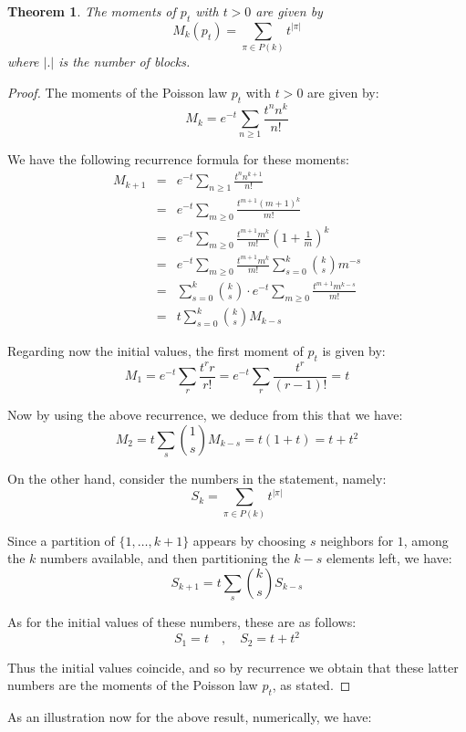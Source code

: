 \documentclass[12pt]{amsbook}
\newtheorem{theorem}{Theorem}[chapter]
\begin{document}

\begin{theorem}
The moments of $p_t$ with $t>0$ are given by
$$M_k(p_t)=\sum_{\pi\in P(k)}t^{|\pi|}$$
where $|.|$ is the number of blocks.
\end{theorem}

\begin{proof}
The moments of the Poisson law $p_t$ with $t>0$ are given by:
$$M_k=e^{-t}\sum_{n\geq1}\frac{t^nn^k}{n!}$$

We have the following recurrence formula for these moments:
\begin{eqnarray*}
M_{k+1}
&=&e^{-t}\sum_{n\geq1}\frac{t^nn^{k+1}}{n!}\\
&=&e^{-t}\sum_{m\geq0}\frac{t^{m+1}(m+1)^k}{m!}\\
&=&e^{-t}\sum_{m\geq0}\frac{t^{m+1}m^k}{m!}\left(1+\frac{1}{m}\right)^k\\
&=&e^{-t}\sum_{m\geq0}\frac{t^{m+1}m^k}{m!}\sum_{s=0}^k\binom{k}{s}m^{-s}\\
&=&\sum_{s=0}^k\binom{k}{s}\cdot e^{-t}\sum_{m\geq0}\frac{t^{m+1}m^{k-s}}{m!}\\
&=&t\sum_{s=0}^k\binom{k}{s}M_{k-s}
\end{eqnarray*}

Regarding now the initial values, the first moment of $p_t$ is given by:
$$M_1
=e^{-t}\sum_r\frac{t^rr}{r!}
=e^{-t}\sum_r\frac{t^r}{(r-1)!}
=t$$

Now by using the above recurrence, we deduce from this that we have:
$$M_2
=t\sum_s\binom{1}{s}M_{k-s}
=t(1+t)
=t+t^2$$

On the other hand, consider the numbers in the statement, namely:
$$S_k=\sum_{\pi\in P(k)}t^{|\pi|}$$

Since a partition of $\{1,\ldots,k+1\}$ appears by choosing $s$ neighbors for $1$, among the $k$ numbers available, and then partitioning the $k-s$ elements left, we have:
$$S_{k+1}=t\sum_s\binom{k}{s}S_{k-s}$$

As for the initial values of these numbers, these are as follows:
$$S_1=t\quad,\quad S_2=t+t^2$$

Thus the initial values coincide, and so by recurrence we obtain that these latter numbers are the moments of the Poisson law $p_t$, as stated.
\end{proof}

As an illustration now for the above result, numerically, we have:

\end{document}
